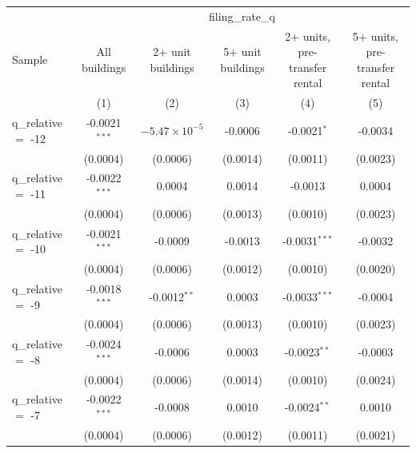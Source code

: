 
\begingroup
\centering
\begin{tabular}{lccccc}
   \toprule
    & \multicolumn{5}{c}{filing\_rate\_q}\\
   Sample               & All buildings   & 2+ unit buildings      & 5+ unit buildings & 2+ units, pre-transfer rental & 5+ units, pre-transfer rental \\   
                        & (1)             & (2)                    & (3)               & (4)                           & (5)\\  
   \midrule 
   q\_relative $=$ -12  & -0.0021$^{***}$ & $-5.47\times 10^{-5}$  & -0.0006           & -0.0021$^{*}$                 & -0.0034\\   
                        & (0.0004)        & (0.0006)               & (0.0014)          & (0.0011)                      & (0.0023)\\   
   q\_relative $=$ -11  & -0.0022$^{***}$ & 0.0004                 & 0.0014            & -0.0013                       & 0.0004\\   
                        & (0.0004)        & (0.0006)               & (0.0013)          & (0.0010)                      & (0.0023)\\   
   q\_relative $=$ -10  & -0.0021$^{***}$ & -0.0009                & -0.0013           & -0.0031$^{***}$               & -0.0032\\   
                        & (0.0004)        & (0.0006)               & (0.0012)          & (0.0010)                      & (0.0020)\\   
   q\_relative $=$ -9   & -0.0018$^{***}$ & -0.0012$^{**}$         & 0.0003            & -0.0033$^{***}$               & -0.0004\\   
                        & (0.0004)        & (0.0006)               & (0.0013)          & (0.0010)                      & (0.0023)\\   
   q\_relative $=$ -8   & -0.0024$^{***}$ & -0.0006                & 0.0003            & -0.0023$^{**}$                & -0.0003\\   
                        & (0.0004)        & (0.0006)               & (0.0014)          & (0.0010)                      & (0.0024)\\   
   q\_relative $=$ -7   & -0.0022$^{***}$ & -0.0008                & 0.0010            & -0.0024$^{**}$                & 0.0010\\   
                        & (0.0004)        & (0.0006)               & (0.0012)          & (0.0011)                      & (0.0021)\\   

\end{tabular}
